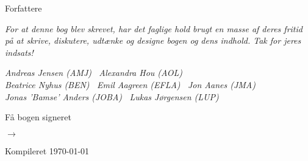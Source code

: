 \cleardoublepage
\begin{titlepage}
	\centering
	\vspace{3cm}
	{\Huge Forfattere \par} \vspace{0.5cm}
	{\small\itshape For at denne bog blev skrevet, har det faglige hold brugt en masse af deres fritid på at skrive, diskutere, udtænke og designe bogen og dens indhold. Tak for jeres indsats!\par} \vspace{0.75cm}
	{\itshape Andreas Jensen (AMJ) \, Alexandra Hou (AOL) \\ 
		Beatrice Nyhus (BEN) \, Emil Aagreen (EFLA) \, Jon Aanes (JMA) \\ 
		Jonas 'Bamse' Anders (JOBA) \, Lukas Jørgensen (LUP)\par}
	\vfill
	{\large Få bogen signeret\par} \vspace{0.5cm}
	{\fontsize{50}{80} $\rightarrow$\par} \vspace{2cm}
	{Kompileret \today\par}
\end{titlepage}
